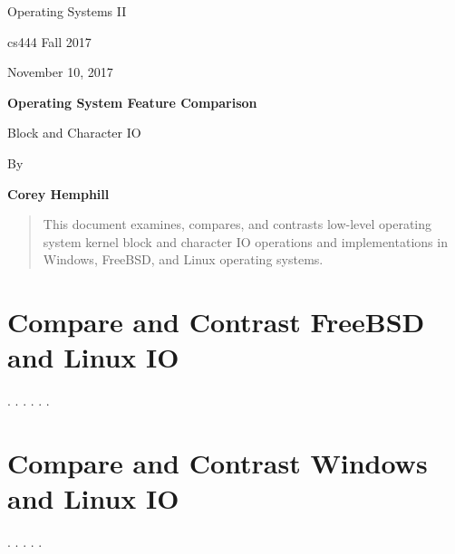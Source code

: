\documentclass[letterpaper,10pt,draftclsnofoot,onecolumn]{IEEEtran}
\def \Author{Corey Hemphill}
\def \Title{Operating System Feature Comparison}
\def \Subtitle{Block and Character IO}
\def \Term{cs444 Fall 2017}
\def \DueDate{November 10, 2017}
\def \DocType{
	Operating Systems II
}
\begin{document}
\begin{titlepage}
    \begin{singlespace}
        \hfill  
        \par\vspace{.2in}
        \centering
        \scshape {
            \huge  \DocType \par
           	\huge \Term \par
            {\large \DueDate}\par
            \vspace{.5in}
            \textbf{\Huge \Title}\par
            {\large \Subtitle}\par
            \vspace{.5in}          
            {\large By }\par
           	\textbf{\Author}\par
            \vspace{5pt}
            }
            \vspace{120pt}
        
        \begin{abstract}
        This document examines, compares, and contrasts low-level operating system kernel block and character IO operations and implementations in Windows, FreeBSD, and Linux operating systems.
        \end{abstract}
        
    \end{singlespace}
\end{titlepage}
\newpage

\section{Compare and Contrast FreeBSD and Linux IO}






\cite{MSWindows1IO}.
\cite{MSWindows2IO}.
\cite{MSWindows3IO}.
\cite{MSWindows4IO}.
\cite{Linux1IO}.
\cite{Linux2IO}.


\section{Compare and Contrast Windows and Linux IO}
\cite{FreeBSD1IO}.
\cite{FreeBSD2IO}.
\cite{FreeBSD3IO}.
\cite{Linux1IO}.
\cite{Linux2IO}.






%


\newpage


\end{document}
